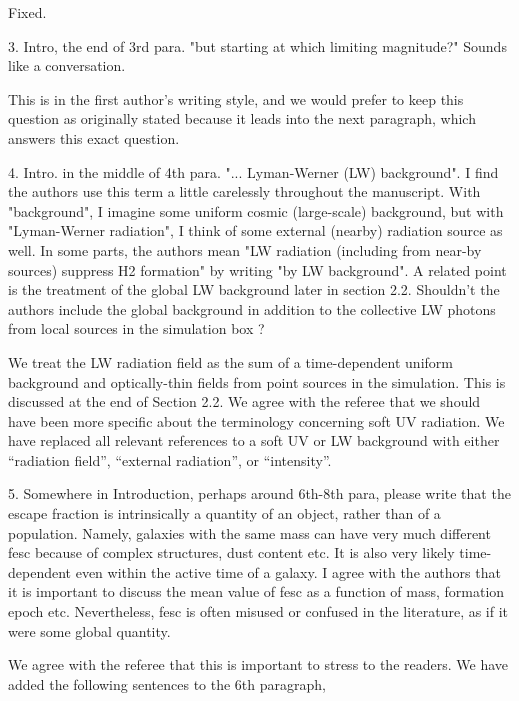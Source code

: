 \documentclass[11pt]{article}
\begin{document}
Fixed.
 
\begin{referee}
3. Intro, the end of 3rd para.
"but starting at which limiting magnitude?"
Sounds like a conversation.
\end{referee}

This is in the first author's writing style, and we would prefer to
keep this question as originally stated because it leads into the next
paragraph, which answers this exact question.

\begin{referee}
4. Intro. in the middle of 4th para.
"... Lyman-Werner (LW) background".
I find the authors use this term a little carelessly
throughout the manuscript.
With "background", I imagine some uniform cosmic
(large-scale) background, but with
"Lyman-Werner radiation", I think of some external
(nearby) radiation source as well.
In some parts, the authors mean "LW radiation
(including from near-by sources) suppress H2 formation" 
by writing "by LW background".
A related point is the treatment of the global LW background
later in section 2.2. Shouldn't the authors include the global
background in addition to the collective LW photons
from local sources in the simulation box ?
\end{referee}

We treat the LW radiation field as the sum of a time-dependent uniform
background and optically-thin fields from point sources in the
simulation.  This is discussed at the end of Section 2.2.  We agree
with the referee that we should have been more specific about the
terminology concerning soft UV radiation.  We have replaced all
relevant references to a soft UV or LW background with either
``radiation field'', ``external radiation'', or ``intensity''.

\begin{referee}
5. Somewhere in Introduction, perhaps around
6th-8th para, please write that the escape fraction
is intrinsically a quantity of an object, rather than
of a population. Namely, galaxies with the same mass
can have very much different fesc because of complex
structures, dust content etc. It is also very likely
time-dependent even within the active time of a galaxy.
I agree with the authors that it is important to discuss
the mean value of fesc as a function of mass, formation
epoch etc. Nevertheless, fesc is often misused or confused
in the literature, as if it were some global quantity.
\end{referee}

We agree with the referee that this is important to stress to the
readers.  We have added the following sentences to the 6th paragraph,
\end{document}

